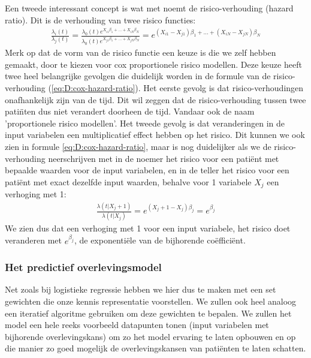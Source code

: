 \begin{abstract*}
\begin{itemize}
\end{itemize}
Een tweede interessant concept is wat met noemt de risico-verhouding (hazard ratio). Dit is de verhouding van twee risico functies:
\begin{equation}
\label{eq:D:cox-hazard-ratio}
\begin{split}
\frac{\lambda_{i}(t)}{\lambda_{j}(t)} 
= \frac{\lambda_{0}(t)e^{X_{i1}\beta_{1} + ... + X_{iN}\beta_{N}}}{\lambda_{0}(t)e^{X_{j1}\beta_{1} + ... + X_{jN}\beta_{N}}}
= e^{(X_{i1}-X_{j1})\beta_{1} + ... + (X_{iN}-X_{jN})\beta_{N}}
\end{split}
\end{equation}
Merk op dat de vorm van de risico functie een keuze is die we zelf hebben gemaakt, door te kiezen voor cox proportionele risico modellen. Deze keuze heeft twee heel belangrijke gevolgen die duidelijk worden in de formule van de risico-verhouding (\ref{eq:D:cox-hazard-ratio}). Het eerste gevolg is dat risico-verhoudingen onafhankelijk zijn van de tijd. Dit wil zeggen dat de risico-verhouding tussen twee pati\"nten dus niet verandert doorheen de tijd. Vandaar ook de naam 'proportionele risico modellen'. Het tweede gevolg is dat veranderingen in de input variabelen een multiplicatief effect hebben op het risico. Dit kunnen we ook zien in formule \ref{eq:D:cox-hazard-ratio}, maar is nog duidelijker als we de risico-verhouding neerschrijven met in de noemer het risico voor een pati\"ent met bepaalde waarden voor de input variabelen, en in de teller het risico voor een pati\"ent met exact dezelfde input waarden, behalve voor 1 variabele $X_{j}$ een verhoging met 1:
\begin{equation}
\begin{split}
\frac{\lambda(t|X_{j}+1)}{\lambda(t|X_{j})} = e^{(X_{j}+1-X_{j})\beta_{j}} = e^{\beta_{j}}
\end{split}
\end{equation}
We zien dus dat een verhoging met 1 voor een input variabele, het risico doet veranderen met $e^{\beta_{j}}$, de exponenti\"ele van de bijhorende co\"effici\"ent.

\subsubsection{Het predictief overlevingsmodel}
Net zoals bij logistieke regressie hebben we hier dus te maken met een set gewichten die onze kennis representatie voorstellen. We zullen ook heel analoog een iteratief algoritme gebruiken om deze gewichten te bepalen. We zullen het model een hele reeks voorbeeld datapunten tonen (input variabelen met bijhorende overlevingskans) om zo het model ervaring te laten opbouwen en op die manier zo goed mogelijk de overlevingskansen van pati\"enten te laten schatten.


\end{abstract*}
